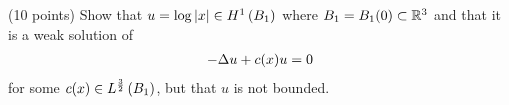(10 points)
Show that $u = \log|x| \in \sobolevh{B_1}{1}$ where $B_1 = B_1(0) \subset \reals^3$
and that it is a weak solution of
\begin{align*}
  -\lapl u + c(x) u = 0
\end{align*}
for some $c(x) \in \lnfunc{B_1}{\frac{3}{2}}$,
but that $u$ is not bounded.
